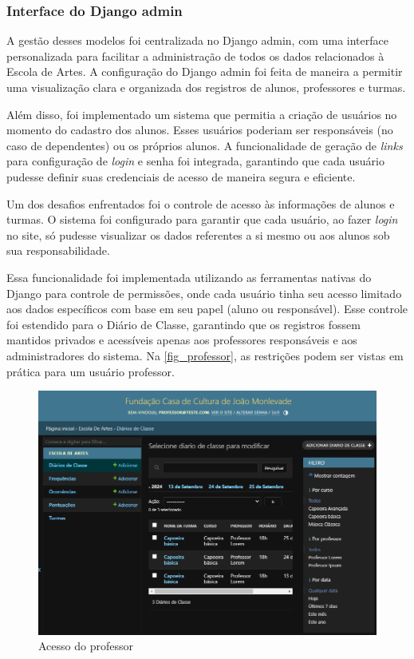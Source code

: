 \subsubsection{Interface do Django admin}

A gestão desses modelos foi centralizada no Django admin, com uma interface personalizada para facilitar a administração de todos os dados relacionados à Escola de Artes. A configuração do Django admin foi feita de maneira a permitir uma visualização clara e organizada dos registros de alunos, professores e turmas.

Além disso, foi implementado um sistema que permitia a criação de usuários no momento do cadastro dos alunos. Esses usuários poderiam ser responsáveis (no caso de dependentes) ou os próprios alunos. A funcionalidade de geração de \textit{links} para configuração de \textit{login} e senha foi integrada, garantindo que cada usuário pudesse definir suas credenciais de acesso de maneira segura e eficiente.

Um dos desafios enfrentados foi o controle de acesso às informações de alunos e turmas. O sistema foi configurado para garantir que cada usuário, ao fazer \textit{login} no site, só pudesse visualizar os dados referentes a si mesmo ou aos alunos sob sua responsabilidade.

Essa funcionalidade foi implementada utilizando as ferramentas nativas do Django para controle de permissões, onde cada usuário tinha seu acesso limitado aos dados específicos com base em seu papel (aluno ou responsável). Esse controle foi estendido para o Diário de Classe, garantindo que os registros fossem mantidos privados e acessíveis apenas aos professores responsáveis e aos administradores do sistema. Na \autoref{fig_professor}, as restrições podem ser vistas em prática para um usuário professor.

\begin{figure}[htb]
	\caption{\label{fig_professor}Acesso do professor}
	\begin{center}
	    \includegraphics[scale=0.5]{./img/admin_professor.png}
	\end{center}
\end{figure}

